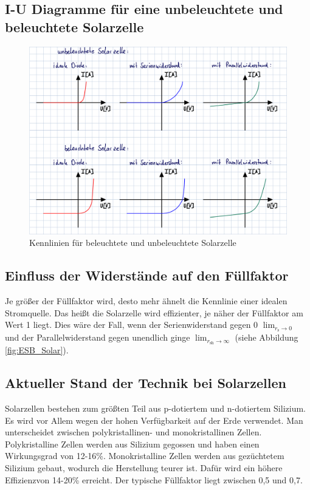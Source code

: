 \documentclass[a4paper]{scrartcl}
\numberwithin{equation}{subsection}
\begin{document}
\subsection{I-U Diagramme für eine unbeleuchtete und beleuchtete Solarzelle}

\begin{figure}[H]
\includegraphics[width=16cm]{Kennlinie}
\centering
\caption{Kennlinien für beleuchtete und unbeleuchtete Solarzelle}
\centering
\label{fig:Kennlinien}
\end{figure}

\subsection{Einfluss der Widerstände auf den Füllfaktor}
Je größer der Füllfaktor wird, desto mehr ähnelt die Kennlinie einer idealen Stromquelle. Das heißt die
Solarzelle wird effizienter, je näher der Füllfaktor am Wert 1 liegt. Dies wäre der Fall, wenn
der Serienwiderstand gegen 0 $\lim_{r_{\text{s}} \to 0}$ und der Parallelwiderstand gegen unendlich ginge
$\lim_{r_{\text{sh}} \to \infty}$ (siehe Abbildung \ref{fig:ESB_Solar}).

\subsection{Aktueller Stand der Technik bei Solarzellen}
Solarzellen bestehen zum größten Teil aus p-dotiertem und n-dotiertem Silizium.
Es wird vor Allem wegen der hohen Verfügbarkeit auf der Erde verwendet.
Man unterscheidet zwischen polykristallinen- und monokristallinen Zellen.
Polykristalline Zellen werden aus Silizium gegossen und haben einen Wirkungsgrad
von 12-16\%. Monokristalline Zellen werden aus gezüchtetem Silizium gebaut, wodurch die Herstellung
teurer ist. Dafür wird ein höhere Effizienzvon 14-20\% erreicht. Der typische Füllfaktor liegt
zwischen 0,5 und 0,7.
\end{document}
